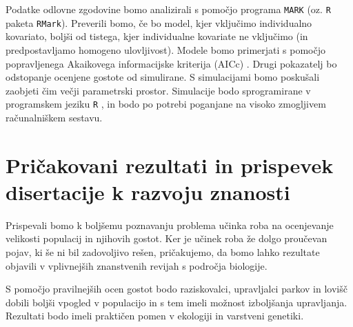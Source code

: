 \documentclass[a4paper]{article}
\begin{document}
Podatke odlovne zgodovine bomo analizirali s pomočjo programa \texttt{MARK} (oz. \texttt{R} paketa \texttt{RMark}). Preverili bomo, če bo model, kjer vključimo individualno kovariato, boljši od tistega, kjer individualne kovariate ne vključimo (in predpostavljamo homogeno ulovljivost). Modele bomo primerjati s pomočjo popravljenega Akaikovega informacijske kriterija (AICc) \citep{akaike1974, burnham-anderson2002}. Drugi pokazatelj bo odstopanje ocenjene gostote od simulirane. S simulacijami bomo poskušali zaobjeti čim večji parametrski prostor. Simulacije bodo sprogramirane v programskem jeziku \texttt{R} \citep{rcore}, in bodo po potrebi poganjane na visoko zmogljivem računalniškem sestavu.



\section{Pričakovani rezultati in prispevek disertacije k razvoju znanosti}

Prispevali bomo k boljšemu poznavanju problema učinka roba na ocenjevanje velikosti populacij in njihovih gostot. Ker je učinek roba že dolgo proučevan pojav, ki še ni bil zadovoljivo rešen, pričakujemo, da bomo lahko rezultate objavili v vplivnejših znanstvenih revijah s področja biologije.

S pomočjo pravilnejših ocen gostot bodo raziskovalci, upravljalci parkov in lovišč dobili boljši vpogled v populacijo in s tem imeli možnost izboljšanja upravljanja. Rezultati bodo imeli praktičen pomen v ekologiji in varstveni genetiki.

%

\newpage


\end{document}
